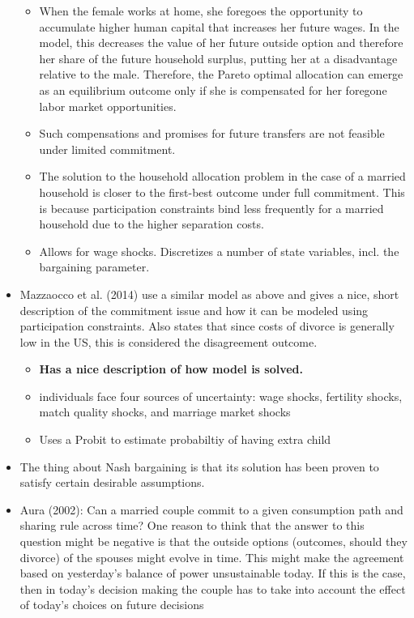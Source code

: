 \begin{itemize}
\begin{itemize}
\item When the female works at home, she foregoes the opportunity to accumulate higher human capital that increases her future wages. In the model, this decreases the value of her future outside option and therefore her share of the future household surplus, putting her at a disadvantage relative to the male. Therefore, the Pareto optimal allocation can emerge as an equilibrium outcome only if she is compensated for her foregone labor market opportunities.
\item Such compensations and promises for future transfers are not feasible under limited commitment. 
\item The solution to the household allocation problem in the case of a married household is closer to the first-best outcome under full commitment. This is because participation constraints bind less frequently for a married household due to the higher separation costs.
\item Allows for wage shocks. Discretizes a number of state variables, incl. the bargaining parameter.
\end{itemize}
\item Mazzaocco et al. (2014) use a similar model as above and gives a nice, short description of the commitment issue and how it can be modeled using participation constraints. Also states that since costs of divorce is generally low in the US, this is considered the disagreement outcome.
\begin{itemize}
\item \textbf{Has a nice description of how model is solved.}
\item individuals face four sources of uncertainty: wage shocks, fertility shocks, match quality shocks, and marriage market shocks 
\item Uses a Probit to estimate probabiltiy of having extra child
\end{itemize}
\item The thing about Nash bargaining is that its solution has been proven to satisfy certain desirable assumptions. 
\item Aura (2002): Can a married couple commit to a given consumption path and sharing rule across time? One reason to think that the answer to this question might
be negative is that the outside options (outcomes, should they divorce) of the spouses might evolve in time. This might make the agreement based on yesterday’s balance of power unsustainable today. If this is the case, then in today’s decision making the couple has to take into account the effect of today’s choices on future decisions

\end{itemize}
